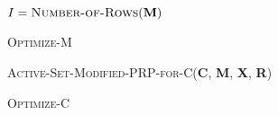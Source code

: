 \begin{algorithm}[h]
$I = \textsc{Number-of-Rows}(\textbf{M})$\;
\caption{\textsc{Optimize-M}}
\label{alg:opt-M}
\end{algorithm}

\begin{algorithm}[h]
\textsc{Active-Set-Modified-PRP-for-C}(\textbf{C}, \textbf{M}, \textbf{X}, \textbf{R})\;
\caption{\textsc{Optimize-C}}
\label{alg:opt-M}
\end{algorithm}

